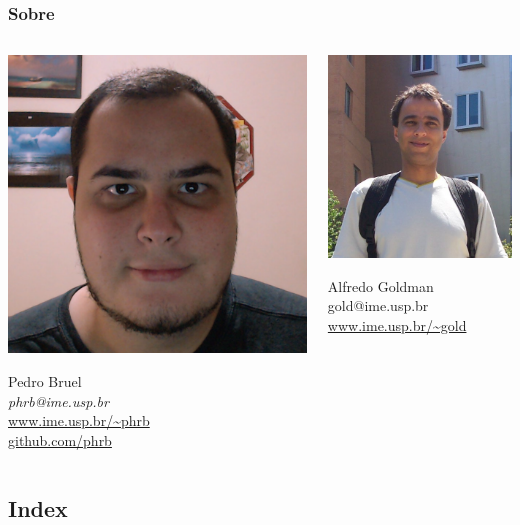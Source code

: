 \documentclass[10pt, compress, aspectratio=169]{beamer}
\begin{document}
\begin{frame}
    \frametitle{Sobre}
    \begin{columns}[T,onlytextwidth]
        \begin{center}
            \includegraphics[width=.45\textwidth]{pedro}

            Pedro Bruel \\
            \emph{\alert{phrb}@ime.usp.br} \\[.3cm]
            \url{www.ime.usp.br/~phrb} \\
            \url{github.com/phrb} \\
        \end{center}

        \begin{center}
            \includegraphics[width=.4\textwidth]{alfredo}

            Alfredo Goldman \\
            \alert{gold}@ime.usp.br \\[.3cm]
            \url{www.ime.usp.br/~gold} \\
        \end{center}
    \end{columns}
\end{frame}

\subsection{Index}
\end{document}
